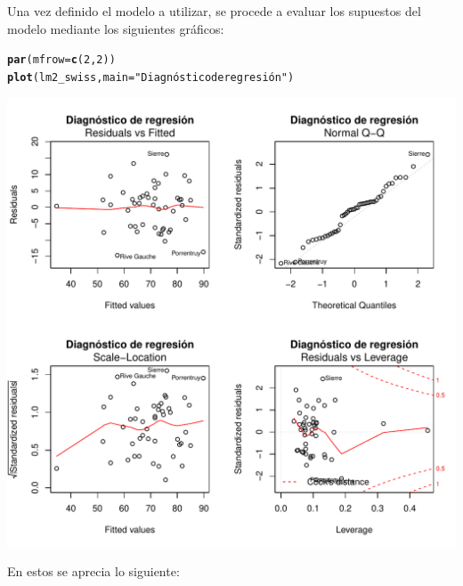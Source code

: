 \documentclass[10pt,a4paper]{article}\usepackage[]{graphicx}\usepackage[]{color}
\makeatletter
\def\maxwidth{ %
  \ifdim\Gin@nat@width>\linewidth
    \linewidth
  \else
    \Gin@nat@width
  \fi
}
\newcommand{\hlnum}[1]{\textcolor[rgb]{0.686,0.059,0.569}{#1}}%
\newcommand{\hlstr}[1]{\textcolor[rgb]{0.192,0.494,0.8}{#1}}%
\newcommand{\hlstd}[1]{\textcolor[rgb]{0.345,0.345,0.345}{#1}}%
\newcommand{\hlkwc}[1]{\textcolor[rgb]{0.333,0.667,0.333}{#1}}%
\newcommand{\hlkwd}[1]{\textcolor[rgb]{0.737,0.353,0.396}{\textbf{#1}}}%
\newenvironment{kframe}{%
 \def\at@end@of@kframe{}%
 \ifinner\ifhmode%
  \def\at@end@of@kframe{\end{minipage}}%
  \begin{minipage}{\columnwidth}%
 \fi\fi%
 \def\FrameCommand##1{\hskip\@totalleftmargin \hskip-\fboxsep
 \colorbox{shadecolor}{##1}\hskip-\fboxsep
     \hskip-\linewidth \hskip-\@totalleftmargin \hskip\columnwidth}%
 \MakeFramed {\advance\hsize-\width
   \@totalleftmargin\z@ \linewidth\hsize
   \@setminipage}}%
 {\par\unskip\endMakeFramed%
 \at@end@of@kframe}
\newenvironment{knitrout}{}{} %
\makeatother
\begin{document}
\newpage
Una vez definido el modelo a utilizar, se procede a evaluar los supuestos del modelo mediante los siguientes gráficos:

\begin{knitrout}\small
{}\color{fgcolor}\begin{kframe}
\begin{alltt}
\hlkwd{par}\hlstd{(}\hlkwc{mfrow}\hlstd{=}\hlkwd{c}\hlstd{(}\hlnum{2}\hlstd{,}\hlnum{2}\hlstd{))}
\hlkwd{plot}\hlstd{(lm2_swiss,}\hlkwc{main} \hlstd{=} \hlstr{"Diagnóstico de regresión"}\hlstd{)}
\end{alltt}
\end{kframe}
\includegraphics[width=\maxwidth]{figure/evalerrores-1} 

\end{knitrout}

En estos se aprecia lo siguiente:
\end{document}
